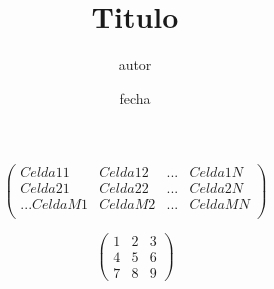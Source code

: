 \documentclass[a4paper]{article}
\title{Titulo}
\author{autor }
\date{fecha}
\begin{document}
 

	$$ 
	\left( %
	\begin{array}{alineacion} %

		Celda11 & Celda12 & ... & Celda1N \\
		Celda21 & Celda22 & ... & Celda2N \\
		.
		.
		.
		CeldaM1 & CeldaM2 & ... & CeldaMN \\

	\end{array} %
	\right) %
	$$







	$$
	\left( \begin{array}{lll}
	1 & 2 & 3 \\ 4 & 5 & 6 \\ 7 & 8 & 9
	\end{array}\right)
	$$
\end{document}
